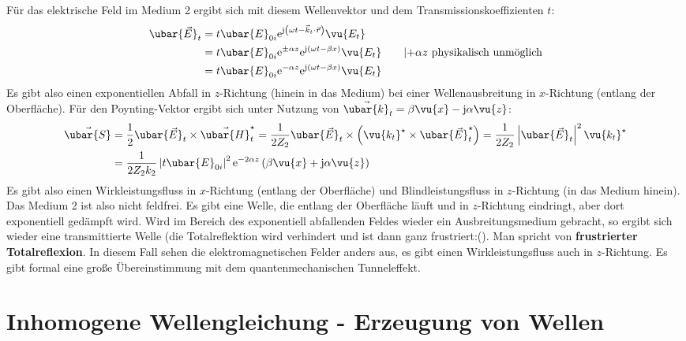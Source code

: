 	 Für das elektrische Feld im Medium 2 ergibt sich mit diesem Wellenvektor und dem Transmissionskoeffizienten \(t\):
			        \begin{align}
				        \ubar{\vec{E}}_t & = t \ubar{E}_{0i}  \mathrm{e}^{\mathrm{j}\left(\omega t - \vec{k}_t\cdot\vec{r}  \right)} \vu{{E_t}}                                                             \nonumber\\
				                         & = t \ubar{E}_{0i}  \mathrm{e}^{\pm\alpha z}  \mathrm{e}^{\mathrm{j}\left(\omega t - \beta x \right)}\vu{{E_t}} \quad\quad |\text{\(+\alpha z\) physikalisch unmöglich}  \\
				                         & = t \ubar{E}_{0i}  \mathrm{e}^{-\alpha z}  \mathrm{e}^{\mathrm{j}\left(\omega t - \beta x \right)}\vu{{E_t}}\nonumber 
			        \end{align}
			        Es gibt also einen exponentiellen Abfall in $z$-Richtung (hinein in das Medium) bei einer Wellenausbreitung in $x$-Richtung (entlang der Oberfläche). Für den Poynting-Vektor ergibt sich unter Nutzung von $\vec{\ubar{k}}_t = \beta \vu{x} - \mathrm{j}\alpha \vu{z}$:
			        \begin{align}
				        \vec{\ubar{S}} & = \frac{1}{2} \ubar{\vec{E}}_t \times \vec{\ubar{H}}_t^\star = \frac{1}{2 Z_2} \ubar{\vec{E}}_t \times \left(\vu{{k_t}}^\star \times \ubar{\vec{E}}_t^\star\right) = \frac{1}{2 Z_2} \left|\ubar{\vec{E}}_t\right|^2 \vu{{k_t}}^\star \\
				        & = \frac{1}{2 Z_2 k_2} \left|t \ubar{E}_{0i} \right|^2  \mathrm{e}^{-2\alpha z}\left( \beta \vu{x} +\mathrm{j}\alpha \vu{z}\right)
			        \end{align}
			  Es gibt also einen Wirkleistungsfluss in $x$-Richtung (entlang der Oberfläche) und Blindleistungsfluss in $z$-Richtung (in das Medium hinein). Das Medium 2 ist also nicht feldfrei. Es gibt eine Welle, die entlang der Oberfläche läuft und in $z$-Richtung eindringt, aber dort exponentiell gedämpft wird.		   Wird im Bereich des exponentiell abfallenden Feldes wieder ein Ausbreitungsmedium gebracht, so ergibt sich wieder eine transmittierte Welle (die Totalreflektion wird verhindert und ist dann ganz frustriert:(). Man spricht von \textbf{frustrierter Totalreflexion}. In diesem Fall sehen die elektromagnetischen Felder anders aus, es gibt einen Wirkleistungsfluss auch in $z$-Richtung. Es gibt formal eine große Übereinstimmung mit dem quantenmechanischen Tunneleffekt.
 \section{Inhomogene Wellengleichung - Erzeugung von Wellen}\label{erzemwell}
